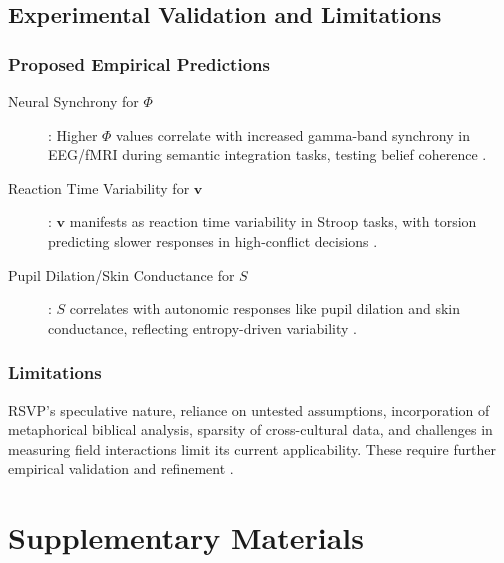 \documentclass[12pt]{report}
\newcommand{\PhiRSVP}{\Phi}
\newcommand{\vRSVP}{\mathbf{v}}
\newcommand{\SRSVP}{S}
\begin{document}
\chapter{Experimental Validation and Limitations}
\section{Proposed Empirical Predictions}
\begin{description}
    \item[Neural Synchrony for \(\PhiRSVP\)]: Higher \(\PhiRSVP\) values correlate with increased gamma-band synchrony in EEG/fMRI during semantic integration tasks, testing belief coherence \citep{Fries2005}.
    \item[Reaction Time Variability for \(\vRSVP\)]: \(\vRSVP\) manifests as reaction time variability in Stroop tasks, with torsion predicting slower responses in high-conflict decisions \citep{SemanticField2025}.
    \item[Pupil Dilation/Skin Conductance for \(\SRSVP\)]: \(\SRSVP\) correlates with autonomic responses like pupil dilation and skin conductance, reflecting entropy-driven variability \citep{SemanticField2025}.
\end{description}

\section{Limitations}
RSVP’s speculative nature, reliance on untested assumptions, incorporation of metaphorical biblical analysis, sparsity of cross-cultural data, and challenges in measuring field interactions limit its current applicability. These require further empirical validation and refinement \citep{RSVPMeta2025}.

\part{Supplementary Materials}
\end{document}
